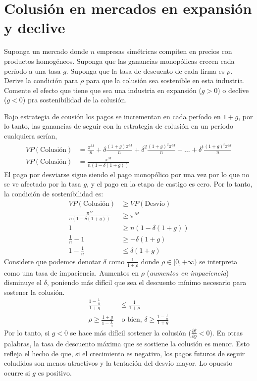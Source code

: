 \section{Colusión en mercados en expansión y declive}

Suponga un mercado donde $n$ empresas simétricas compiten en precios con productos homogéneos. Suponga que las ganancias monopólicas crecen cada período a una tasa $g$. Suponga que la tasa de descuento de cada firma es $\rho$. Derive la condición para $\rho$ para que la colusión sea sostenible en esta industria. Comente el efecto que tiene que sea una industria en expansión ($g>0$) o declive ($g<0$) pra sostenibilidad de la colusión.

\begin{solution}
    Bajo estrategia de cousión los pagos se incrementan en cada período en $1+g$, por lo tanto, las ganancias de seguir con la estrategia de colusión en un período cualquiera serían,
    \begin{align*}
        VP(\text{Colusión}) &= \frac{\pi^M}{n} + \delta \frac{(1+g)\pi^M}{n} + \delta^2 \frac{(1+g)^2 \pi^M}{n} + \ldots + \delta ^t \frac{(1+g)^t \pi^M}{n} \\
        VP(\text{Colusión}) &= \frac{\pi^M}{n(1-\delta(1+g))}
    \end{align*}
    El pago por desviarse sigue siendo el pago monopólico por una vez por lo que no se ve afectado por la tasa $g$, y el pago en la etapa de castigo es cero. Por lo tanto, la condición de sostenibilidad es:
    \begin{align*}
        VP(\text{Colusión}) &\geq VP(\text{Desvío}) \\
        \frac{\pi^M}{n(1-\delta(1+g))} &\geq \pi^M \\
        1 & \geq n(1-\delta(1+g)) \\
        \frac{1}{n}-1 & \geq -\delta (1+g) \\
        1-\frac{1}{n} &\leq \delta (1+g)
    \end{align*}
    Considere que podemos denotar $\delta$ como $\frac{1}{1+\rho}$ donde $\rho \in [0,+\infty)$ se interpreta como una tasa de impaciencia. Aumentos en $\rho$ (\textit{aumentos en impaciencia}) disminuye el $\delta$, poniendo más difícil que sea el descuento mínimo necesario para sostener la colusión.
    \begin{align*}
        \frac{1-\frac{1}{n}}{1+g} &\leq \frac{1}{1+\rho} \\
        \boxed{\rho \geq \frac{1+g}{1-\frac{1}{n}}} & \text{ o bien, } \boxed{\delta \geq \frac{1-\frac{1}{n}}{1+g}}
    \end{align*}
     Por lo tanto, si $g<0$ se hace más difícil sostener la colusión ($\frac{\partial \delta}{\partial g}<0$). En otras palabras, la tasa de descuento máxima que se sostiene la colusión es menor. Esto refleja el hecho de que, si el crecimiento es negativo, los pagos futuros de seguir coludidos son menos atractivos y la tentación del desvío mayor. Lo opuesto ocurre si $g$ es positivo.
\end{solution}